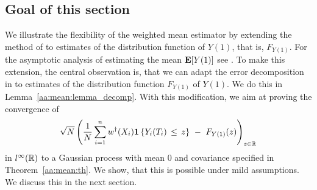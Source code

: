 \subsection*{Goal of this section}
We illustrate the flexibility of 
the weighted mean estimator by 
extending the method of \cite{Wang2019} to
estimates of 
the distribution function of $Y(1)$, that is, $F_{Y(1)}$.
For the asymptotic analysis of estimating the mean $\mathbf{E}[Y(1)]$ see \cite[Proof of Theorem~3]{Wang2019}.
To make this extension, the central observation is, that we can adapt the error decomposition in \cite[page 27]{Wang2019} 
to estimates of the distribution function $F_{Y(1)}$ of $Y(1)$.
We do this in Lemma~\ref{aa:mean:lemma_decomp}.
With this modification, we aim at proving
the convergence of
\begin{gather}
    \sqrt{N}
    \left( 
  \frac{1}{N}
    \sum_{i=1}^{n} 
    w^\dagger(X_i)
    \mathbf{1}\left\{ Y_i(T_i)\,\le\, z \right\}
    \ 
    -
    \ 
    F_{Y(1)}(z)
    \right)
    _{z\in\R}
    \,
  \end{gather}
  in
  $l^\infty(\mathbb{R})$
  to a Gaussian process with mean 0 and covariance specified in Theorem~\ref{aa:mean:th}.
  We show, that this is possible under mild assumptions.
  We discuss this in the next section.
